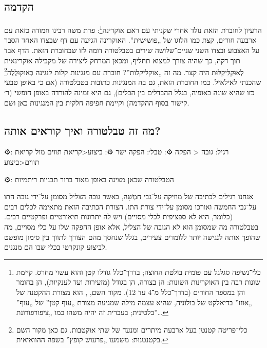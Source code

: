 \subsection*{הקדמה}

הרעיון לחוברת הזאת נולד אחרי שקניתי עם ראם אוקרינה\footnote{כלי־נשיפה סגלגל עם פומית בולטת החוצה; בדרך־כלל גודלו קטן והוא עשוי מחרס. קיימת שונות רבה בין האוקרינות השונות: הן בצורה, הן בגודל (מזעירות ועד לענקיות), הן בחומר והן במספר החורים (בדרך־כלל מ־4 עד 12). מקור השם, , הוא מצורת ההקטנה של  „אווז” בדיאלקט של בולוניה, שהיא עצמה מילה שמגיעה מצורת  „עוף קטן” של  „עוף” בלטינית; בעברית זה יהיה משהו כמו „ציפורפורונת”…}: פרת משה רבינו חמודה כזאת עם ארבעה חורים, קצת כמו הלוגו של „פושישית”. האוקרינה הגיעה עם דף שבצדו האחד הסבר על האצבוע ובצדו השני שניים־שלושה שירים בטבלטורה דומה לזו שבחוברת הזאת. הדף אבד תוך דקה, כך שהיה צורך למצוא תחליף, ומכאן המרחק ליצירה של מקבילה אוקרינאית לְאוּקַלֵּיקַלּוּת היה קצר. מה זה „אוקליקלות”? חוברת עם מנגינות קלות לנגינה בְּאוּקוּלֶלֶה\footnote{כלי־פריטה קטנטן בעל ארבעה מיתרים ומנעד של שתי אוקטבות. גם כאן מקור השם בקטנטנוּת:  משמעו „פרעוש קופץ” בשפה ההוואיאית.} שהכנתי לאילאיל. כמו החוברת הזאת, גם בה המנגינות כתובות בטבלטורה (אם כי באופן טבעי כזו שהיא שונה באופיה, בגלל ההבדלים בין הכלים), גם היא זמינה להורדה באופן חופשי (ר׳ קישור בסוף ההקדמה) וקיימת חפיפה חלקית בין המנגינות כאן ושם.



\subsection*{מה זה טבלטורה ואיך קוראים אותה?}

⚙: רגיל: גובה < הפקה
⚙: טבל׳: הפקה ישר
⚙: ביצוע<קריאת תווים מול קריאת תווים<ביצוע

⚙: הטבלטורה שכאן מציגה באופן מאוד ברור תבניות ריתמיות

אנחנו רגילים לכתיבה של מוזיקה על־גבי חַמְשָׁה, כאשר גובה הצליל מסומן על־ידי גובה התו על־גבי החמשה ואורכו מסומן על־ידי צורת התו. הצורת הכתיבה הזאת מתאימה לכלים רבים (כלומר, היא לא ספציפית לכלי מסויים) ויש לה יתרונות תיאורטיים ופרקטיים רבים. בטבלטורה מה שמסומן הוא לא הגובה של הצליל, אלא אופן ההפקה שלו על כלי מסויים, מה שהופך אותה לנגישה יותר ללומדים צעירים, בגלל שנחסך מהם הצורך לתווך בין סימון מופשט לביצוע קונקרטי בכלי שבו הם מנגנים.

